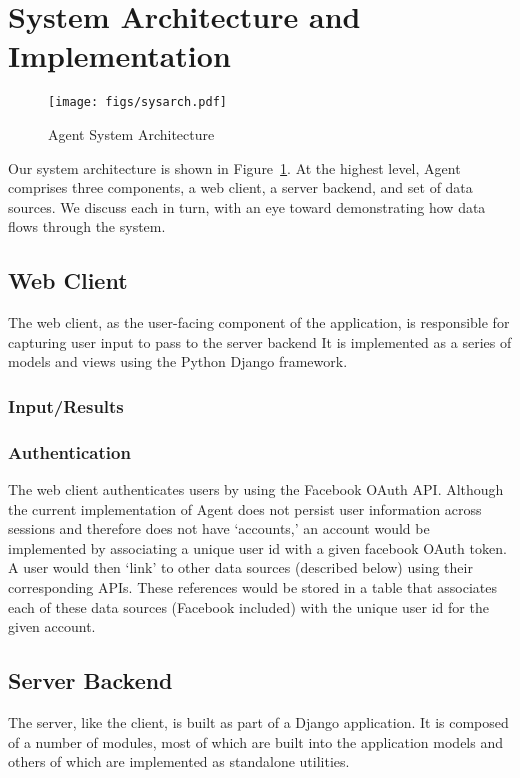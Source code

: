 \section{System Architecture and Implementation}
\label{sec:architecture}

\begin{figure}[!h]
\texttt{[image: figs/sysarch.pdf]}
\caption{Agent System Architecture}
\label{fig:sysarch}
\end{figure}

Our system architecture is shown in Figure~\ref{fig:sysarch}. At the highest
level, Agent comprises three components, a web client, a server backend, and set
of data sources. We discuss each in turn, with an eye toward demonstrating how
data flows through the system.

\subsection{Web Client}
The web client, as the user-facing component of the application, is responsible
for capturing user input to pass to the server backend  It is implemented as a
series of models and views using the Python Django framework.

\subsubsection{Input/Results}

\subsubsection{Authentication}
The web client authenticates users by using the Facebook OAuth API. Although the
current implementation of Agent does not persist user information across
sessions and therefore does not have `accounts,' an account would be implemented
by associating a unique user id with a given facebook OAuth token. A user would
then `link' to other data sources (described below) using their corresponding
APIs. These references would be stored in a table that associates each of these
data sources (Facebook included) with the unique user id for the given account.

\subsection{Server Backend}
The server, like the client, is built as part of a Django application. It is
composed of a number of modules, most of which are built into the application
models and others of which are implemented as standalone utilities.

